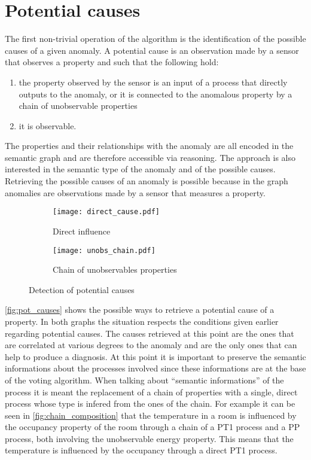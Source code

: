 \section{Potential causes}
The first non-trivial operation of the algorithm is the identification of the possible causes of a given anomaly. A potential cause is an observation made by a sensor that observes a property and such that the following hold:
\begin{enumerate}
  \item the property observed by the sensor is an input of a process that directly outputs to the anomaly, or it is connected to the anomalous property by a chain of unobservable properties
  \item it is observable.
\end{enumerate}
The properties and their relationships with the anomaly are all encoded in the semantic graph and are therefore accessible via reasoning. The approach is also interested in the semantic type of the anomaly and of the possible causes.
Retrieving the possible causes of an anomaly is possible because in the graph anomalies are observations made by a sensor that measures a property.
\begin{figure}
  \begin{subfigure}[b]{\textwidth}
    \centering
      \texttt{[image: direct\_cause.pdf]}
      \caption{Direct influence}
      \label{fig:direct_influence}
  \end{subfigure}
  \bigskip
  \begin{subfigure}[b]{\textwidth}
    \centering
      \texttt{[image: unobs\_chain.pdf]}
      \caption{Chain of unobservables properties}
      \label{fig:chain_unobs}
  \end{subfigure}
  \caption{Detection of potential causes}
  \label{fig:pot_causes}
\end{figure}
\autoref{fig:pot_causes} shows the possible ways to retrieve a potential cause of a property. In both graphs the situation respects the conditions given earlier regarding potential causes.
The causes retrieved at this point are the ones that are correlated at various degrees to the anomaly and are the only ones that can help to produce a diagnosis. At this point it is important to preserve the semantic informations %
about the processes involved since these informations are at the base of the voting algorithm. When talking about ``semantic informations'' of the process it is meant the replacement of a chain of properties with a single, direct process whose type is infered from the ones of the chain. For example it can be seen in \autoref{fig:chain_composition} that the temperature in a room is influenced by the occupancy property of the room through a chain of a PT1 process and a PP process, both involving the unobservable energy property. This means that the temperature is influenced by the occupancy through a direct PT1 process.
